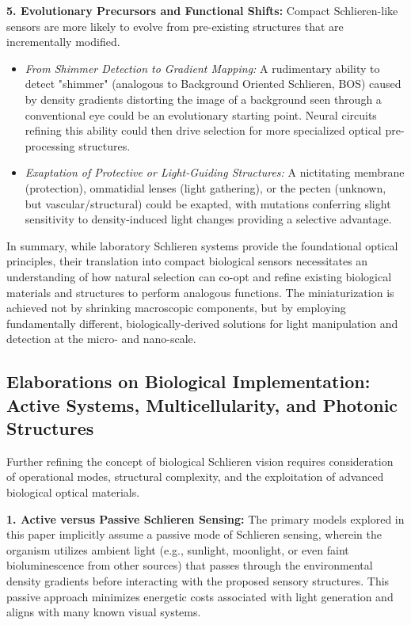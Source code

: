 \documentclass[11pt]{article}
\begin{document}
\textbf{5. Evolutionary Precursors and Functional Shifts:}
Compact Schlieren-like sensors are more likely to evolve from pre-existing structures that are incrementally modified.
    \begin{itemize}
        \item \textit{From Shimmer Detection to Gradient Mapping:} A rudimentary ability to detect "shimmer" (analogous to Background Oriented Schlieren, BOS) caused by density gradients distorting the image of a background seen through a conventional eye could be an evolutionary starting point. Neural circuits refining this ability could then drive selection for more specialized optical pre-processing structures.
        \item \textit{Exaptation of Protective or Light-Guiding Structures:} A nictitating membrane (protection), ommatidial lenses (light gathering), or the pecten (unknown, but vascular/structural) could be exapted, with mutations conferring slight sensitivity to density-induced light changes providing a selective advantage.
    \end{itemize}

In summary, while laboratory Schlieren systems provide the foundational optical principles, their translation into compact biological sensors necessitates an understanding of how natural selection can co-opt and refine existing biological materials and structures to perform analogous functions. The miniaturization is achieved not by shrinking macroscopic components, but by employing fundamentally different, biologically-derived solutions for light manipulation and detection at the micro- and nano-scale.

\subsection{Elaborations on Biological Implementation: Active Systems, Multicellularity, and Photonic Structures}
\label{sec:bio_implementation_details} %

Further refining the concept of biological Schlieren vision requires consideration of operational modes, structural complexity, and the exploitation of advanced biological optical materials.

\textbf{1. Active versus Passive Schlieren Sensing:}
The primary models explored in this paper implicitly assume a passive mode of Schlieren sensing, wherein the organism utilizes ambient light (e.g., sunlight, moonlight, or even faint bioluminescence from other sources) that passes through the environmental density gradients before interacting with the proposed sensory structures. This passive approach minimizes energetic costs associated with light generation and aligns with many known visual systems.
\end{document}

